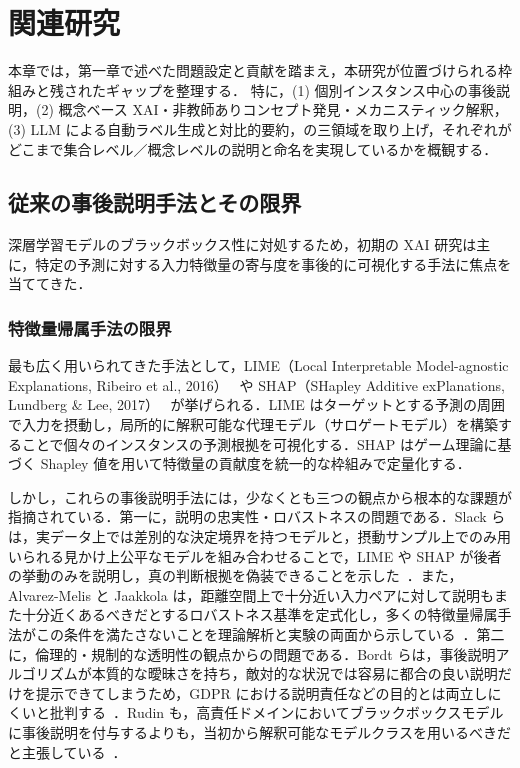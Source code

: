 \chapter{関連研究}

本章では，第一章で述べた問題設定と貢献を踏まえ，本研究が位置づけられる枠組みと残されたギャップを整理する．
特に，(1) 個別インスタンス中心の事後説明，(2) 概念ベース XAI・非教師ありコンセプト発見・メカニスティック解釈，(3) LLM による自動ラベル生成と対比的要約，の三領域を取り上げ，それぞれがどこまで集合レベル／概念レベルの説明と命名を実現しているかを概観する．

\section{従来の事後説明手法とその限界}

深層学習モデルのブラックボックス性に対処するため，初期の XAI 研究は主に，特定の予測に対する入力特徴量の寄与度を事後的に可視化する手法に焦点を当ててきた．

\subsection{特徴量帰属手法の限界}

最も広く用いられてきた手法として，LIME（Local Interpretable Model-agnostic Explanations, Ribeiro et al., 2016）~\cite{ribeiro2016should} や SHAP（SHapley Additive exPlanations, Lundberg \& Lee, 2017）~\cite{lundberg2017unified} が挙げられる．LIME はターゲットとする予測の周囲で入力を摂動し，局所的に解釈可能な代理モデル（サロゲートモデル）を構築することで個々のインスタンスの予測根拠を可視化する．SHAP はゲーム理論に基づく Shapley 値を用いて特徴量の貢献度を統一的な枠組みで定量化する．

しかし，これらの事後説明手法には，少なくとも三つの観点から根本的な課題が指摘されている．第一に，説明の忠実性・ロバストネスの問題である．Slack らは，実データ上では差別的な決定境界を持つモデルと，摂動サンプル上でのみ用いられる見かけ上公平なモデルを組み合わせることで，LIME や SHAP が後者の挙動のみを説明し，真の判断根拠を偽装できることを示した~\cite{slack2020fooling}．また，Alvarez-Melis と Jaakkola は，距離空間上で十分近い入力ペアに対して説明もまた十分近くあるべきだとするロバストネス基準を定式化し，多くの特徴量帰属手法がこの条件を満たさないことを理論解析と実験の両面から示している~\cite{alvarez2018robustness}．第二に，倫理的・規制的な透明性の観点からの問題である．Bordt らは，事後説明アルゴリズムが本質的な曖昧さを持ち，敵対的な状況では容易に都合の良い説明だけを提示できてしまうため，GDPR における説明責任などの目的とは両立しにくいと批判する~\cite{bordt2022posthoc}．Rudin も，高責任ドメインにおいてブラックボックスモデルに事後説明を付与するよりも，当初から解釈可能なモデルクラスを用いるべきだと主張している~\cite{rudin2019stop}．

